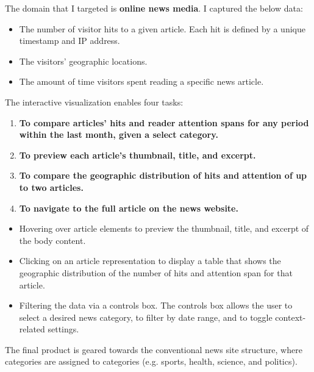 \documentclass[12pt]{article}
\begin{document}
The domain that I targeted is \textbf{online news media}. I captured the below data:
\begin{itemize}
\item The number of visitor hits to a given article. Each hit is defined by a unique timestamp and IP address.
\item The visitors' geographic locations.
\item The amount of time visitors spent reading a specific news article.
\end{itemize}

\newpage

\noindent The interactive visualization enables four tasks:
\begin{enumerate}
\item \textbf{To compare articles' hits and reader attention spans for any period within the last month, given a select category.}
\item \textbf{To preview each article's thumbnail, title, and excerpt.}
\item \textbf{To compare the geographic distribution of hits and attention of up to two articles.}
\item \textbf{To navigate to the full article on the news website.}
\end{enumerate}

\begin{itemize}
\item Hovering over article elements to preview the thumbnail, title, and excerpt of the body content.
\item Clicking on an article representation to display a table that shows the geographic distribution of the number of hits and attention span for that article.
\item Filtering the data via a controls box. The controls box allows the user to select a desired news category, to filter by date range, and to toggle context-related settings. 
\end{itemize}

\noindent The final product is geared towards the conventional news site structure, where categories are assigned to categories (e.g. sports, health, science, and politics). \\
\end{document}
